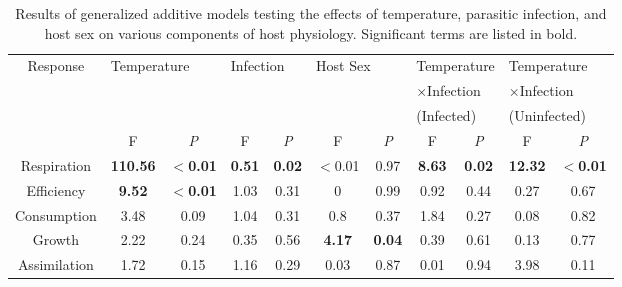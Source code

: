 \begin{landscape}

{\small
\begin{table} [H]
\caption [Results of generalized additive models testing the effects of temperature, parasitic infection, and host sex on host physiology.]{Results of generalized additive models testing the effects of temperature, parasitic infection, and host sex on various components of host physiology. Significant terms are listed in bold.}
\centering
\begin{tabular}{ c  c  c  c  c  c  c  c  c  c  c  } \toprule
Response  & \multicolumn{2}{l}{Temperature} & \multicolumn{2}{l}{Infection} & \multicolumn{2}{l}{Host Sex} & \multicolumn{2}{l}{Temperature} & \multicolumn{2}{l}{Temperature} \\
                  &            &                    &               &               &                    &         & \multicolumn{2}{l}{$\times$Infection}     & \multicolumn{2}{l}{$\times$Infection}   \\ 
                  &            &                    &               &               &                    &         & \multicolumn{2}{l}{(Infected)}     & \multicolumn{2}{l}{(Uninfected)}   \\ \midrule
                  & F           & \emph{P}                & F              & \emph{P}             & F                  & \emph{P}        & F                & \emph{P}               & F           & \emph{P}                     \\
Respiration       & \textbf{110.56}     &\textbf{$<$0.01}     & \textbf{0.51}          & \textbf{0.02}        & $<$0.01    & 0.97    & \textbf{8.63}             & \textbf{0.02}            & \textbf{12.32}       & \textbf{$<$0.01}    \\
Efficiency        & \textbf{9.52}       & \textbf{$<$0.01}     & 1.03          & 0.31          & 0                  & 0.99    & 0.92             & 0.44            & 0.27        & 0.67                 \\
Consumption       & 3.48       & 0.09               & 1.04          & 0.31          & 0.8                & 0.37    & 1.84             & 0.27            & 0.08        & 0.82                 \\
Growth            & 2.22       & 0.24               & 0.35          & 0.56          & \textbf{4.17}               &\textbf{0.04}    & 0.39             & 0.61            & 0.13        & 0.77                 \\
Assimilation      & 1.72       & 0.15               & 1.16          & 0.29          & 0.03               & 0.87    & 0.01             & 0.94            & 3.98        & 0.11          \\ \bottomrule     
\end{tabular}
\label{tab:physiot}
\end{table}
}
\end{landscape}

